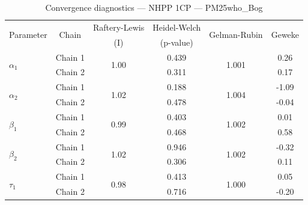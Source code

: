 \begin{table}[H]
\centering
\caption{Convergence diagnostics — NHPP 1CP — PM25who_Bog}
\begin{tabular}{lccccc}
\toprule
\multirow{2}{*}{Parameter} & \multirow{2}{*}{Chain} & Raftery-Lewis & Heidel-Welch & \multirow{2}{*}{Gelman-Rubin} & \multirow{2}{*}{Geweke} \\
 & & (I) & (p-value) & & (z) \\
\midrule
\multirow{2}{*}{$\alpha_1$} & Chain 1 & \multirow{2}{*}{1.00} & 0.439 & \multirow{2}{*}{1.001} & 0.26 \\
 & Chain 2 & & 0.311 & & 0.17 \\
\multirow{2}{*}{$\alpha_2$} & Chain 1 & \multirow{2}{*}{1.02} & 0.188 & \multirow{2}{*}{1.004} & -1.09 \\
 & Chain 2 & & 0.478 & & -0.04 \\
\midrule
\multirow{2}{*}{$\beta_1$} & Chain 1 & \multirow{2}{*}{0.99} & 0.403 & \multirow{2}{*}{1.002} & 0.01 \\
 & Chain 2 & & 0.468 & & 0.58 \\
\multirow{2}{*}{$\beta_2$} & Chain 1 & \multirow{2}{*}{1.02} & 0.946 & \multirow{2}{*}{1.002} & -0.32 \\
 & Chain 2 & & 0.306 & & 0.11 \\
\midrule
\multirow{2}{*}{$\tau_1$} & Chain 1 & \multirow{2}{*}{0.98} & 0.413 & \multirow{2}{*}{1.000} & 0.05 \\
 & Chain 2 & & 0.716 & & -0.20 \\
\bottomrule
\end{tabular}
\end{table}
